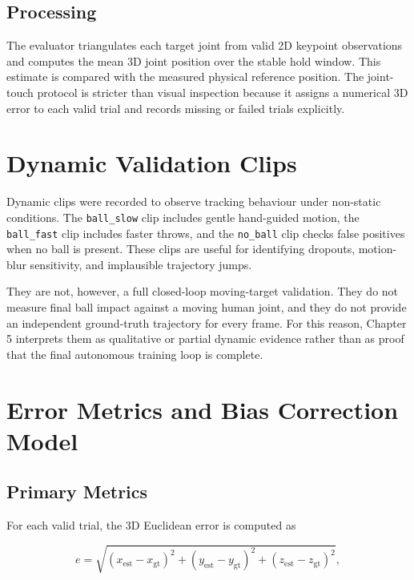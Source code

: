 \subsection{Processing}

The evaluator triangulates each target joint from valid 2D keypoint observations and computes the mean 3D joint position over the stable hold window. This estimate is compared with the measured physical reference position. The joint-touch protocol is stricter than visual inspection because it assigns a numerical 3D error to each valid trial and records missing or failed trials explicitly.

\section{Dynamic Validation Clips}

Dynamic clips were recorded to observe tracking behaviour under non-static conditions. The \texttt{ball\_slow} clip includes gentle hand-guided motion, the \texttt{ball\_fast} clip includes faster throws, and the \texttt{no\_ball} clip checks false positives when no ball is present. These clips are useful for identifying dropouts, motion-blur sensitivity, and implausible trajectory jumps.

They are not, however, a full closed-loop moving-target validation. They do not measure final ball impact against a moving human joint, and they do not provide an independent ground-truth trajectory for every frame. For this reason, Chapter 5 interprets them as qualitative or partial dynamic evidence rather than as proof that the final autonomous training loop is complete.

\section{Error Metrics and Bias Correction Model}

\subsection{Primary Metrics}

For each valid trial, the 3D Euclidean error is computed as

\begin{equation}
e = \sqrt{(x_{\text{est}} - x_{\text{gt}})^2 + (y_{\text{est}} - y_{\text{gt}})^2 + (z_{\text{est}} - z_{\text{gt}})^2},
\label{eqn:4_1_euclidean_error}
\end{equation}

